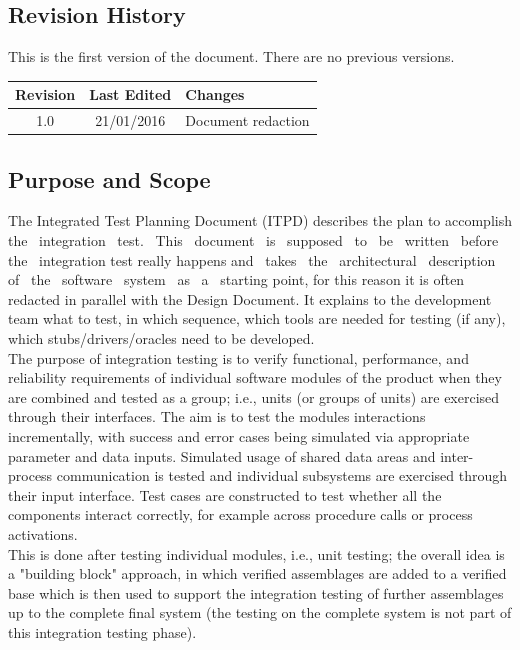 \documentclass[a4paper,11pt]{report} %
\begin{document}
	\subsection{Revision History}
		This is the first version of the document. There are no previous versions.
		
		\begin{center}
			\begin{tabular}{| l | p{2.5cm} | p{9cm} |}\hline
				\multicolumn{1}{|c|}{\textbf{Revision}} & \multicolumn{1}{|c|}{\textbf{Last Edited}} & \textbf{Changes}\\\hline
				\multicolumn{1}{|c|}{1.0} & \multicolumn{1}{|c|}{21/01/2016} & Document redaction\\\hline
			\end{tabular}
		\end{center}
		
	\subsection{Purpose and Scope}
		The Integrated Test Planning Document (ITPD) describes the plan to accomplish the  integration  test.  This  document  is  supposed  to  be  written  before  the  integration  test  really  happens and  takes  the  architectural  description  of  the  software  system  as  a  starting point, for this reason it is often redacted in parallel with the Design Document. It explains to the development team what to test, in which sequence, which tools are needed for testing (if any), which stubs/drivers/oracles need to be developed.\\		
		The purpose of integration testing is to verify functional, performance, and reliability requirements of individual software modules of the product when they are combined and tested as a group; i.e., units (or groups of units) are exercised through their interfaces. The aim is to test the modules interactions incrementally, with success and error cases being simulated via appropriate parameter and data inputs. Simulated usage of shared data areas and inter-process communication is tested and individual subsystems are exercised through their input interface. Test cases are constructed to test whether all the components interact correctly, for example across procedure calls or process activations.\\
		This is done after testing individual modules, i.e., unit testing; the overall idea is a "building block" approach, in which verified assemblages are added to a verified base which is then used to support the integration testing of further assemblages up to the complete final system (the testing on the complete system is not part of this integration testing phase).
		
\end{document}
